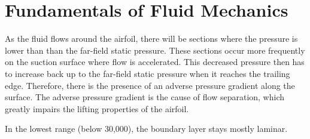 \documentclass[letterpaper,12pt,]{article}
\begin{document}
\section{Fundamentals of Fluid Mechanics}

As the fluid flows around the airfoil, there will be sections where the pressure is lower than than the far-field static pressure. These sections occur more frequently on the suction surface where flow is accelerated. This decreased pressure then has to increase back up to the far-field static pressure when it reaches the trailing edge. Therefore, there is the presence of an adverse pressure gradient along the surface. The adverse pressure gradient is the cause of flow separation, which greatly impairs the lifting properties of the airfoil.

In the lowest \rn range (below 30,000), the boundary layer stays mostly laminar. 


%
%
\end{document}
